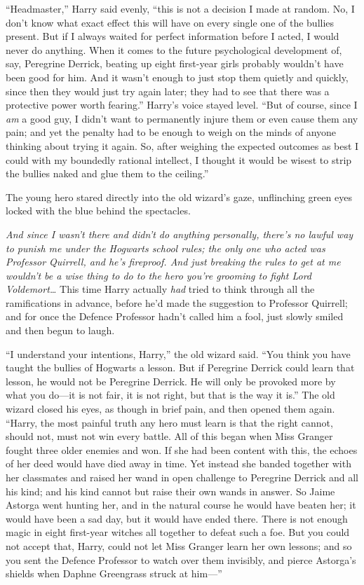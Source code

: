``Headmaster,'' Harry said evenly, ``this is not a decision I made at
random. No, I don't know what exact effect this will have on every
single one of the bullies present. But if I always waited for perfect
information before I acted, I would never do anything. When it comes to
the future psychological development of, say, Peregrine Derrick, beating
up eight first-year girls probably wouldn't have been good for him. And
it wasn't enough to just stop them quietly and quickly, since then they
would just try again later; they had to see that there was a protective
power worth fearing.'' Harry's voice stayed level. ``But of course,
since I \emph{am} a good guy, I didn't want to permanently injure them
or even cause them any pain; and yet the penalty had to be enough to
weigh on the minds of anyone thinking about trying it again. So, after
weighing the expected outcomes as best I could with my boundedly
rational intellect, I thought it would be wisest to strip the bullies
naked and glue them to the ceiling.''

The young hero stared directly into the old wizard's gaze, unflinching
green eyes locked with the blue behind the spectacles.

\emph{And since I wasn't there and didn't do anything personally,
there's no lawful way to punish me under the Hogwarts school rules; the
only one who acted was Professor Quirrell, and he's fireproof. And just
breaking the rules to get at me wouldn't be a wise thing to do to the
hero you're grooming to fight Lord Voldemort\ldots{}} This time Harry
actually \emph{had} tried to think through all the ramifications in
advance, before he'd made the suggestion to Professor Quirrell; and for
once the Defence Professor hadn't called him a fool, just slowly smiled
and then begun to laugh.

``I understand your intentions, Harry,'' the old wizard said. ``You
think you have taught the bullies of Hogwarts a lesson. But if Peregrine
Derrick could learn that lesson, he would not be Peregrine Derrick. He
will only be provoked more by what you do---it is not fair, it is not
right, but that is the way it is.'' The old wizard closed his eyes, as
though in brief pain, and then opened them again. ``Harry, the most
painful truth any hero must learn is that the right cannot, should not,
must not win every battle. All of this began when Miss Granger fought
three older enemies and won. If she had been content with this, the
echoes of her deed would have died away in time. Yet instead she banded
together with her classmates and raised her wand in open challenge to
Peregrine Derrick and all his kind; and his kind cannot but raise their
own wands in answer. So Jaime Astorga went hunting her, and in the
natural course he would have beaten her; it would have been a sad day,
but it would have ended there. There is not enough magic in eight
first-year witches all together to defeat such a foe. But you could not
accept that, Harry, could not let Miss Granger learn her own lessons;
and so you sent the Defence Professor to watch over them invisibly, and
pierce Astorga's shields when Daphne Greengrass struck at him---''

